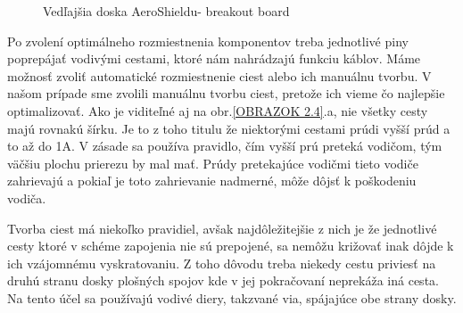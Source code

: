\begin{figure}[!tbh]
	\hfill
	\hfill
	\hfill
	\caption{Vedľajšia doska AeroShieldu- breakout board}\label{OBRAZOK 2.6}
\end{figure}

Po zvolení optimálneho rozmiestnenia komponentov treba jednotlivé piny poprepájať vodivými cestami, ktoré nám nahrádzajú funkciu káblov. Máme možnosť zvoliť automatické rozmiestnenie ciest alebo ich manuálnu tvorbu. V našom prípade sme zvolili manuálnu tvorbu ciest, pretože ich vieme čo najlepšie optimalizovať. Ako je viditeľné aj na obr.\ref{OBRAZOK 2.4}.a, nie všetky cesty majú rovnakú šírku. Je to z toho titulu že niektorými cestami prúdi vyšší prúd a to až do 1A. V zásade sa používa pravidlo, čím vyšší prú preteká vodičom, tým väčšiu plochu prierezu by mal mať. Prúdy pretekajúce vodičmi tieto vodiče zahrievajú a pokiaľ je toto zahrievanie nadmerné, môže dôjsť k poškodeniu vodiča.  

Tvorba ciest má niekoľko pravidiel, avšak najdôležitejšie z nich je že jednotlivé cesty ktoré v schéme zapojenia nie sú prepojené, sa nemôžu križovať inak dôjde k ich vzájomnému vyskratovaniu. Z toho dôvodu treba niekedy cestu priviesť na druhú stranu dosky plošných spojov kde v jej pokračovaní neprekáža iná cesta. Na tento účel sa používajú vodivé diery, takzvané via, spájajúce obe strany dosky.

